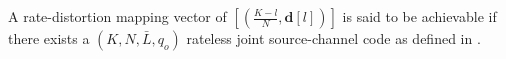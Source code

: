 \begin{definition} \label{def:acheivability}
A rate-distortion mapping vector of $[(\frac{K-l}{N},\mathbf{d}[l])]$ is said to be achievable if there exists a \((K,N, \bar{L}, q_o)\) rateless joint source-channel code as defined in .
\end{definition}











